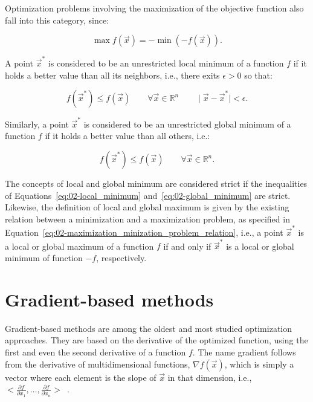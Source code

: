 Optimization problems involving the maximization of the objective
function also fall into this category, since:

\begin{equation}
\max f(\vec{x})=-\min(-f(\vec{x})).\label{eq:02-maximization_minization_problem_relation}
\end{equation}


A point $\vec{x}^{*}$ is considered to be an unrestricted local minimum
of a function $f$ if it holds a better value than all its neighbors,
i.e., there exits $\epsilon>0$ so that:

\begin{equation}
f(\vec{x}^{*})\le f(\vec{x})\qquad\forall\vec{x}\in\mathbb{R}^{n}\qquad\mid\vec{x}-\vec{x}^{*}\mid<\epsilon.\label{eq:02-local_minimum}
\end{equation}


\noindent Similarly, a point $\vec{x}^{*}$ is considered to be an
unrestricted global minimum of a function $f$ if it holds a better
value than all others, i.e.:

\begin{equation}
f(\vec{x}^{*})\leq f(\vec{x})\qquad\forall\vec{x}\in\mathbb{R}^{n}.\label{eq:02-global_minimum}
\end{equation}


The concepts of local and global minimum are considered strict if
the inequalities of Equations~\ref{eq:02-local_minimum} and~\ref{eq:02-global_minimum}
are strict. Likewise, the definition of local and global maximum is
given by the existing relation between a minimization and a maximization
problem, as specified in Equation~\ref{eq:02-maximization_minization_problem_relation},
i.e., a point $\vec{x}^{*}$ is a local or global maximum of a function
$f$ if and only if $\vec{x}^{*}$ is a local or global minimum of
function $-f$, respectively.


\section{Gradient-based methods \label{sec:02-Gradient-based-methods}}

Gradient-based methods are among the oldest and most studied optimization
approaches. They are based on the derivative of the optimized function,
using the first and even the second derivative of a function $f$.
The name gradient follows from the derivative of multidimensional
functions, $\nabla f(\vec{x})$, which is simply a vector where each
element is the slope of $\vec{x}$ in that dimension, i.e., $<\frac{\partial f}{\partial x_{1}},\dots,\frac{\partial f}{\partial x_{n}}>$~\cite{Luke-Essentials_of_metaheuristics:2009}.

